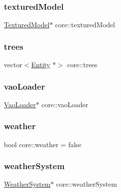 \mbox{\label{namespacecore_ad4d5c25548862489d6a237342748ad74}} 
\subsubsection{\texorpdfstring{textured\+Model}{texturedModel}}
{\footnotesize\ttfamily \hyperlink{classmodel_1_1TexturedModel}{Textured\+Model}$\ast$ core\+::textured\+Model}

\mbox{\label{namespacecore_a7f37c29928536493e41e65032818b8f3}} 
\subsubsection{\texorpdfstring{trees}{trees}}
{\footnotesize\ttfamily vector$<$\hyperlink{classentity_1_1Entity}{Entity} $\ast$$>$ core\+::trees}

\mbox{\label{namespacecore_a78dd24784c415d3759a0f71b8f4f9f81}} 
\subsubsection{\texorpdfstring{vao\+Loader}{vaoLoader}}
{\footnotesize\ttfamily \hyperlink{classcore_1_1VaoLoader}{Vao\+Loader}$\ast$ core\+::vao\+Loader}

\mbox{\label{namespacecore_a6a9140ce7a80c31c7ac37e2567ab60fa}} 
\subsubsection{\texorpdfstring{weather}{weather}}
{\footnotesize\ttfamily bool core\+::weather = false}

\mbox{\label{namespacecore_a985cbb636cfce09e29c1e0cc52b1fbde}} 
\subsubsection{\texorpdfstring{weather\+System}{weatherSystem}}
{\footnotesize\ttfamily \hyperlink{classparticle_1_1WeatherSystem}{Weather\+System}$\ast$ core\+::weather\+System}

